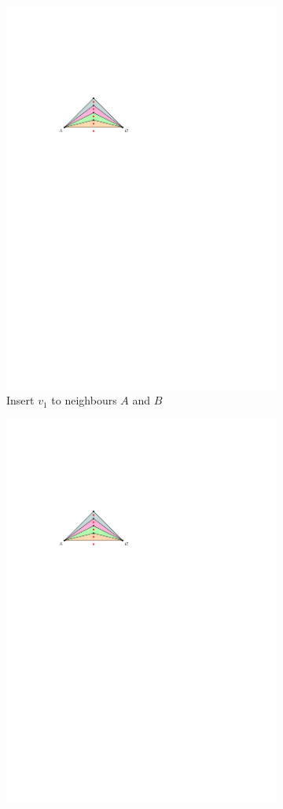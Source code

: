 \begin{figure}[H]
\begin{subfigure}{0.4\textwidth}
	\includegraphics[width=.7\linewidth,page=3]{drawings/k-trees.pdf}
	\caption{Insert $v_1$ to neighbours $A$ and $B$}
\end{subfigure}
\begin{subfigure}{0.4\textwidth}
	\centering
	\includegraphics[width=.7\linewidth,page=4]{drawings/k-trees.pdf}

\end{subfigure}
\end{figure}
